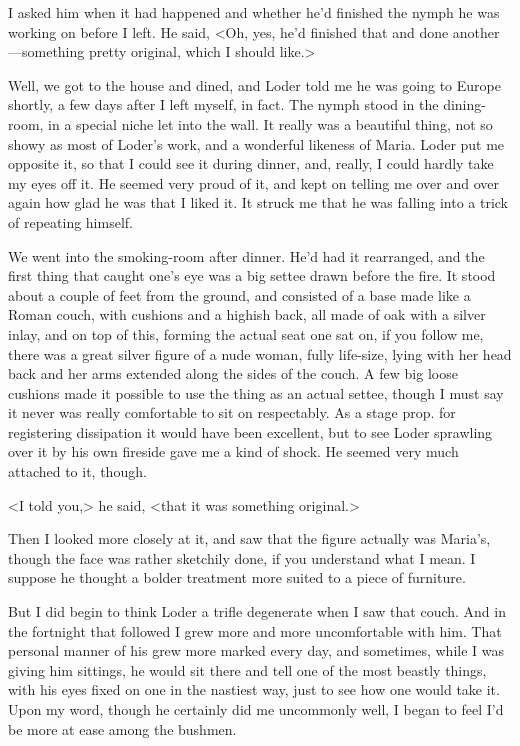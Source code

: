 I asked him when it had happened and whether he'd finished the nymph he was working on before I left. He said, <Oh, yes, he'd finished that and done another—something pretty original, which I should like.>

Well, we got to the house and dined, and Loder told me he was going to Europe shortly, a few days after I left myself, in fact. The nymph stood in the dining-room, in a special niche let into the wall. It really was a beautiful thing, not so showy as most of Loder's work, and a wonderful likeness of Maria. Loder put me opposite it, so that I could see it during dinner, and, really, I could hardly take my eyes off it. He seemed very proud of it, and kept on telling me over and over again how glad he was that I liked it. It struck me that he was falling into a trick of repeating himself.

We went into the smoking-room after dinner. He'd had it rearranged, and the first thing that caught one's eye was a big settee drawn before the fire. It stood about a couple of feet from the ground, and consisted of a base made like a Roman couch, with cushions and a highish back, all made of oak with a silver inlay, and on top of this, forming the actual seat one sat on, if you follow me, there was a great silver figure of a nude woman, fully life-size, lying with her head back and her arms extended along the sides of the couch. A few big loose cushions made it possible to use the thing as an actual settee, though I must say it never was really comfortable to sit on respectably. As a stage prop. for registering dissipation it would have been excellent, but to see Loder sprawling over it by his own fireside gave me a kind of shock. He seemed very much attached to it, though.

<I told you,> he said, <that it was something original.>

Then I looked more closely at it, and saw that the figure actually was Maria's, though the face was rather sketchily done, if you understand what I mean. I suppose he thought a bolder treatment more suited to a piece of furniture.

But I did begin to think Loder a trifle degenerate when I saw that couch. And in the fortnight that followed I grew more and more uncomfortable with him. That personal manner of his grew more marked every day, and sometimes, while I was giving him sittings, he would sit there and tell one of the most beastly things, with his eyes fixed on one in the nastiest way, just to see how one would take it. Upon my word, though he certainly did me uncommonly well, I began to feel I'd be more at ease among the bushmen.

